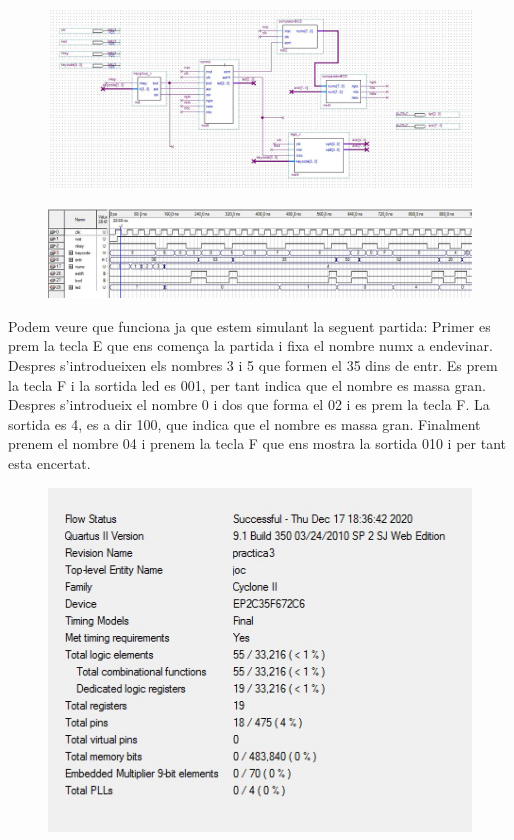 \documentclass[12pt, a4papre]{article}
\begin{document}
				\begin{figure}[H]
		\begin{center}
		\includegraphics[width=130mm]{joc.jpeg}
		\end{center}
	\end{figure}	
			\begin{figure}[H]
		\begin{center}
		\includegraphics[width=130mm]{simulacioJoc.jpeg}
		\end{center}
	\end{figure}	
	
	Podem veure que funciona ja que estem simulant la seguent partida: Primer es prem la tecla E que ens comença la partida i fixa el nombre numx a endevinar. Despres s'introdueixen els nombres 3 i 5 que formen el 35 dins de entr. Es prem la tecla F i la sortida led es 001, per tant indica que el nombre es massa gran. Despres s'introdueix el nombre 0 i dos que forma el 02 i es prem la tecla F. La sortida es 4, es a dir 100, que indica que el nombre es massa gran. Finalment prenem el nombre 04 i prenem la tecla F que ens mostra la sortida 010 i per tant esta encertat.
		
			\begin{figure}[H]
		\begin{center}
		\includegraphics[width=130mm]{informeJoc.jpeg}
		\end{center}
	\end{figure}	
\end{document}
